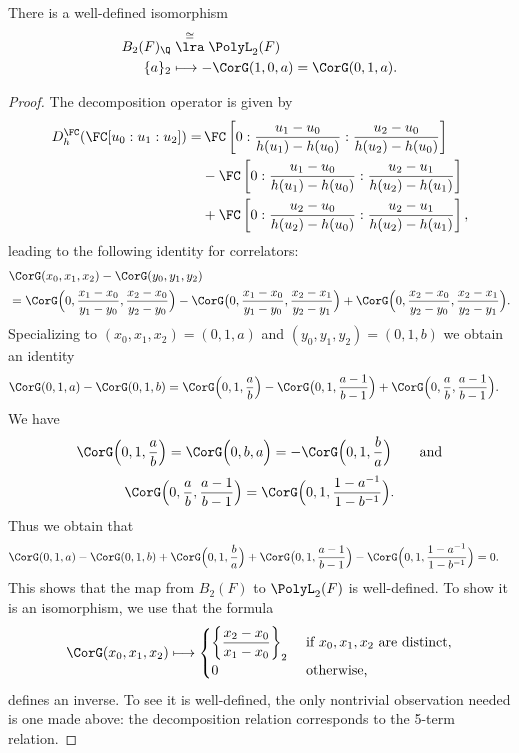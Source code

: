 \documentclass[a4paper]{amsart}
\begin{document}
\begin{proposition} \label{prop: G_2=B_2} There is a well-defined isomorphism
\begin{align*}
B_2(F)_{\Q} &\stackrel{\cong}{\lra} \PolyL_2(F) \\
\{a\}_2 &\longmapsto -\CorG(1,0,a) = \CorG(0,1,a).
\end{align*}
\end{proposition} 
\begin{proof}The decomposition operator is given by
\begin{align*}
D^\FC_h(\FC[u_0:u_1:u_2])
=&\,\FC\left[0:\frac{u_{1}-u_{0}}{h(u_{1})-h(u_0)}:\frac{u_{2}-u_{0}}{h(u_{2})-h(u_0)}\right]\\
&-\FC\left[0:\frac{u_{1}-u_{0}}{h(u_{1})-h(u_0)}:\frac{u_{2}-u_{1}}{h(u_{2})-h(u_1)}\right]\\
&+\FC\left[0:\frac{u_{2}-u_{0}}{h(u_{2})-h(u_0)}:\frac{u_{2}-u_{1}}{h(u_{2})-h(u_1)}\right],
\end{align*}
leading to the following identity for correlators:
\begin{align*}
    &\CorG(x_0,x_1,x_2)-\CorG(y_0, y_1,y_2)\\
     &=\CorG\Bigl(0,\frac{x_1-x_0}{y_1-y_0},\frac{x_2-x_0}{y_2-y_0}\Bigr)-\CorG\bigl(0,\frac{x_1-x_0}{y_1-y_0},\frac{x_2-x_1}{y_2-y_1}\Bigr)+\CorG\Bigl(0,\frac{x_2-x_0}{y_2-y_0},\frac{x_2-x_1}{y_2-y_1}\Bigr).
\end{align*}
Specializing to $(x_0,x_1,x_2)=(0,1,a)$ and $(y_0,y_1,y_2)=(0,1,b)$ we obtain an identity
\begin{align*}
    &\CorG(0,1,a)-\CorG(0, 1,b)=\CorG\Bigl(0,1,\frac{a}{b}\Bigr)-\CorG\bigl(0,1,\frac{a-1}{b-1}\Bigr)+\CorG\Bigl(0,\frac{a}{b},\frac{a-1}{b-1}\Bigr).
\end{align*}
We have 
\[\CorG\Bigl(0,1,\frac{a}{b}\Bigr)=\CorG\Bigl(0,b,a\Bigr)=-\CorG\Bigl(0,1,\frac{b}{a}\Bigr) \qquad \text{and}\]
\[\CorG\Bigl(0,\frac{a}{b},\frac{a-1}{b-1}\Bigr)=\CorG\Bigl(0,1,\frac{1-a^{-1}}{1-b^{-1}}\Bigr).
\]
Thus we obtain that
\begin{align*}
    &\CorG(0,1,a)-\CorG(0, 1,b)+\CorG\Bigl(0,1,\frac{b}{a}\Bigr)+\CorG\bigl(0,1,\frac{a-1}{b-1}\Bigr)-\CorG\Bigl(0,1,\frac{1-a^{-1}}{1-b^{-1}}\Bigr)=0.
\end{align*}
This shows that the map from $B_2(F)$ to $\PolyL_2(F)$ is well-defined. To show it is an isomorphism, we use that the formula 
\[
\CorG(x_0, x_1,x_2) \longmapsto
\begin{cases}
\left\{\dfrac{x_2-x_0}{x_1-x_0}\right\}_2 & \text{ if } x_0,x_1,x_2 \text{ are distinct},\\
0& \text{ otherwise,}
 \end{cases}
\]
defines an inverse. To see it is well-defined, the only nontrivial observation needed is one made above: the decomposition relation corresponds to the 5-term relation.
\end{proof}
\end{document}
